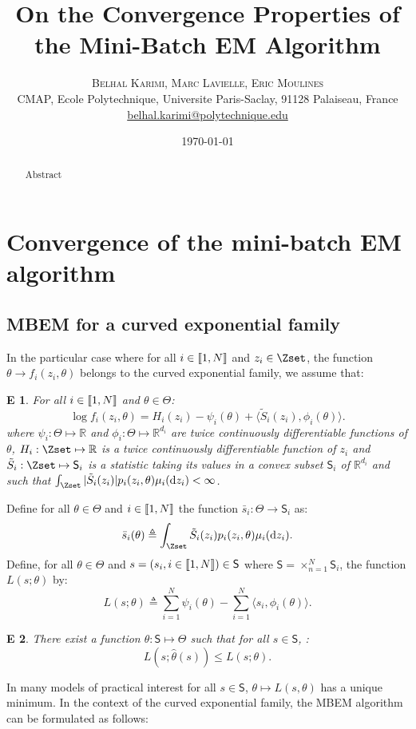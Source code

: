 \documentclass[11pt]{article}
\title{On the Convergence Properties of the Mini-Batch EM Algorithm}
\author{%
\textsc{Belhal Karimi, Marc Lavielle, Eric Moulines}\\
\normalsize  CMAP, Ecole Polytechnique, Universite Paris-Saclay, 91128 Palaiseau, France\\ %
\normalsize \href{mailto:belhal.karimi@polytechnique.edu}{belhal.karimi@polytechnique.edu} %
}
\date{\today} %
\theoremstyle{plain}
\newtheorem{assumption_expo}{E}
\begin{document}
\maketitle

\begin{abstract}
Abstract
\end{abstract}


\section{Convergence of the mini-batch EM algorithm}\label{sec:mbem}

\subsection{MBEM for a curved exponential family} \label{sssec:expo}
In the particular case where for all $i \in \llbracket1,N\rrbracket$ and $z_i \in \Zset$, the function $\theta \to f_i(z_i,\theta)$ belongs to the curved exponential family, we assume that:
\begin{assumption_expo}
For all $i \in \llbracket1,N\rrbracket$ and $\theta \in \Theta$:
\begin{equation}
\log f_i(z_i,\theta) = H_i(z_i) -\psi_i(\theta) + \langle \tilde{S}_i(z_i), \phi_i(\theta)\rangle.
\end{equation}
where $\psi_i: \Theta \mapsto \mathbb{R}$ and $\phi_i: \Theta \mapsto \mathbb{R}^{d_i}$ are twice continuously differentiable functions of $\theta$, $H_i: \Zset \mapsto \mathbb{R}$ is a twice continuously differentiable function of $z_i$ and $\tilde{S}_i: \Zset \mapsto \mathsf{S}_i$ is a statistic taking its values in a convex subset $\mathsf{S}_i$ of $\mathbb{R}^{d_i}$ and such that $\int_{\Zset}{|\tilde{S}_i(z_i)|p_i(z_i,\theta) \mu_i(\dz_i)} < \infty$.
\end{assumption_expo}
\noindent Define for all $\theta \in \Theta$ and $i \in \llbracket1,N\rrbracket$ the function $\bar{s}_i: \Theta \to \mathsf{S}_i$ as:
\begin{equation}
\bar{s}_i(\theta) \triangleq \int_{\Zset}{\tilde{S}_i(z_i)p_i(z_i,\theta) \mu_i(\dz_i)}.
\end{equation}
Define, for all $\theta \in \Theta$ and $s = (s_i, i \in \llbracket1,N\rrbracket) \in \mathsf{S}$ where $\mathsf{S} = \times_{n=1}^N \mathsf{S}_i$, the function $L(s; \theta)$ by:
\begin{equation}\label{curvedL}
L(s;\theta) \triangleq \sum_{i=1}^N{\psi_i(\theta)} - \sum_{i=1}^N{\langle s_i, \phi_i(\theta)\rangle}.
\end{equation}
\begin{assumption_expo}
There exist a function $\hat{\theta}: \mathsf{S} \mapsto \Theta$ such that for all $s \in \mathsf{S}$, :
\begin{equation}\label{max_suff}
L(s;\hat{\theta}(s))\leq L(s;\theta).
\end{equation}
\end{assumption_expo}
In many models of practical interest for all $s \in \mathsf{S}$, $\theta \mapsto L(s,\theta)$ has a unique minimum. In the context of the curved exponential family, the MBEM algorithm can be formulated as follows:
\end{document}
